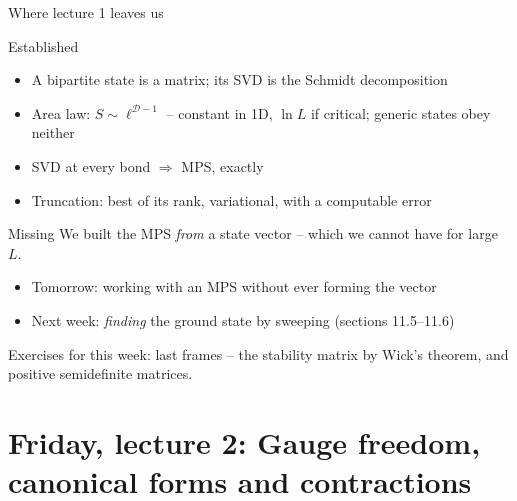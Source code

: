 \documentclass[aspectratio=169,10pt]{beamer}
\begin{document}
\begin{frame}{Where lecture 1 leaves us}
  \begin{block}{Established}
    \begin{itemize}
      \item A bipartite state is a matrix; its SVD is the Schmidt decomposition
      \item Area law: $S\sim\ell^{\mathcal D-1}$ -- constant in 1D, $\ln L$ if critical; generic states obey neither
      \item SVD at every bond $\Rightarrow$ MPS, exactly
      \item Truncation: best of its rank, variational, with a computable error
    \end{itemize}
  \end{block}
  \begin{block}{Missing}
    We built the MPS \emph{from} a state vector -- which we cannot have for large $L$.
    \begin{itemize}
      \item Tomorrow: working with an MPS without ever forming the vector
      \item Next week: \emph{finding} the ground state by sweeping (sections 11.5--11.6)
    \end{itemize}
  \end{block}
  \centering Exercises for this week: last frames -- the stability matrix by Wick's theorem, and positive semidefinite matrices.
\end{frame}

\section{Friday, lecture 2: Gauge freedom, canonical forms and contractions}
\end{document}
